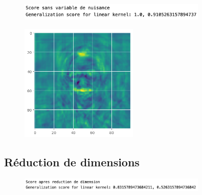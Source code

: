 \documentclass[a4paper,12pt]{article}
\begin{document}
\begin{figure}[H]
    \centering
    \includegraphics[width=0.8\textwidth]{Images/sans_variable.png}
    \caption{}
    \label{fig:}
\end{figure}

\begin{figure}[H]
    \centering
    \includegraphics[width=0.5\textwidth]{Images/coeff_visage.png}
    \caption{}
\end{figure}

\subsection{Réduction de dimensions}

\begin{figure}[H]
    \centering
    \includegraphics[width=0.8\textwidth]{Images/apres_reduction.png}
    \caption{}
    \label{fig:}
\end{figure}
\end{document}
